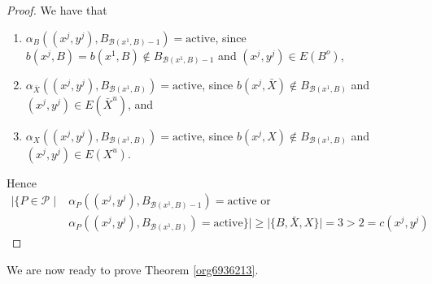 \documentclass[fontsize=11pt,paper=a4]{book}
\begin{document}
\begin{proof}
We have that

\begin{enumerate}
\item \(\alpha_B((x^j,y^j),B_{\mathcal{B}(x^1,B)-1})=\mathrm{active}\), since \(b(x^j,B)=b(x^1,B)\notin B_{\mathcal{B}(x^1,B)-1}\) and \((x^j,y^j)\in E(B^o)\),

\item \(\alpha_{\bar{X}}((x^j,y^j),B_{\mathcal{B}(x^1,B)})=\mathrm{active}\), since \(b(x^j,\bar{X})\notin B_{\mathcal{B}(x^1,B)}\) and \((x^j,y^j)\in E(\bar{X}^u)\), and

\item \(\alpha_{X}((x^j,y^j),B_{\mathcal{B}(x^1,B)})=\mathrm{active}\), since \(b(x^j,X)\notin B_{\mathcal{B}(x^1,B)}\) and \((x^j,y^j)\in E(X^u)\).
\end{enumerate}

Hence
\begin{align*}
\lvert\{P\in\mathcal{P}\mid&\alpha_P((x^j,y^j),B_{\mathcal{B}(x^1,B)-1})=\mathrm{active}\text{ or }\\
&\alpha_P((x^j,y^j),B_{\mathcal{B}(x^1,B)})=\mathrm{active}\}\rvert\geq\lvert\{B,\bar{X},X\}\rvert=3>2=c(x^j,y^j)
\end{align*}
\end{proof}

We are now ready to prove Theorem \ref{org6936213}.
\end{document}
